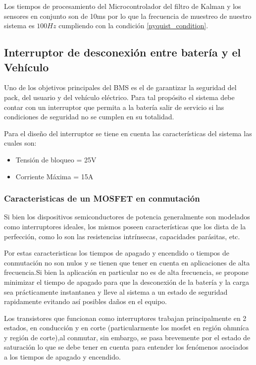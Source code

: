 \documentclass[10pt,a4paper]{article}
\begin{document}
Los tiempos de procesamiento del Microcontrolador del filtro de Kalman y los
sensores en conjunto son de 10ms por lo que la frecuencia de muestreo de nuestro
sistema es $100 Hz$ cumpliendo con la condición \ref{nyquist_condition}.

\subsection{Interruptor de desconexión entre batería y el Vehículo}

Uno de los objetivos principales del BMS es el de garantizar la seguridad del
pack, del usuario y del vehículo eléctrico. Para tal propósito el sistema debe
contar con un interruptor que permita a la batería salir de servicio si las
condiciones de seguridad no se cumplen en su totalidad.

Para el diseño del interruptor se tiene en cuenta las características del
sistema las cuales son:

\begin{itemize}
	\item Tensión de bloqueo = 25V
	\item Corriente Máxima = 15A
\end{itemize}

\subsubsection{Caracteristicas de un MOSFET en conmutación}

Si bien los dispositivos semiconductores de potencia generalmente son modelados
como interruptores ideales, los mismos poseen características que los dista de
la perfección, como lo son las resistencias intrínsecas, capacidades parásitas,
etc.

Por estas caracteristicas los tiempos de apagado y encendido o tiempos de
conmutación no son nulos y se tienen que tener en cuenta en aplicaciones de alta
frecuencia.Si bien la aplicación en particular no es de alta frecuencia, se
propone minimizar el tiempo de apagado para que la desconexión de la batería y
la carga sea prácticamente instantanea y lleve al sistema a un estado de
seguridad rapidamente evitando así posibles daños en el equipo.

Los transistores que funcionan como interruptores trabajan principalmente en 2
estados, en conducción y en corte (particularmente los mosfet en región ohmníca
y región de corte),al conmutar, sin embargo, se pasa brevemente por el estado de
saturación lo que se debe tener en cuenta para entender los fenómenos asociados
a los tiempos de apagado y encendido.
\end{document}
